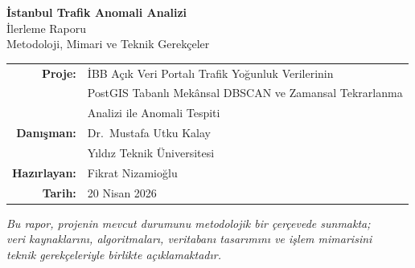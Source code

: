 \documentclass[12pt,a4paper]{article}
\begin{document}
\begin{titlepage}
\centering
\vspace*{3cm}

{\LARGE\bfseries İstanbul Trafik Anomali Analizi}\\[0.6cm]
{\Large İlerleme Raporu}\\[0.3cm]
{\large Metodoloji, Mimari ve Teknik Gerekçeler}\\[2.5cm]

{\normalsize
\begin{tabular}{rl}
\textbf{Proje:}      & İBB Açık Veri Portalı Trafik Yoğunluk Verilerinin \\
                      & PostGIS Tabanlı Mekânsal DBSCAN ve Zamansal Tekrarlanma \\
                      & Analizi ile Anomali Tespiti \\[6pt]
\textbf{Danışman:}    & Dr.\ Mustafa Utku Kalay \\
                      & Yıldız Teknik Üniversitesi \\[6pt]
\textbf{Hazırlayan:}  & Fikrat Nizamioğlu \\[6pt]
\textbf{Tarih:}       & 20 Nisan 2026 \\
\end{tabular}
}
\vfill

{\small
\textit{Bu rapor, projenin mevcut durumunu metodolojik bir çerçevede sunmakta;\\
veri kaynaklarını, algoritmaları, veritabanı tasarımını ve işlem mimarisini\\
teknik gerekçeleriyle birlikte açıklamaktadır.}
}
\end{titlepage}

\tableofcontents
\newpage
\end{document}
